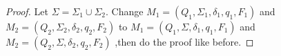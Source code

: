 \documentclass[12pt]{article}
\newenvironment{problem}[2][Problem]{\begin{trivlist}
\item[\hskip \labelsep {\bfseries #1}\hskip \labelsep {\bfseries #2.}]}{\end{trivlist}}
\begin{document}
\begin{paragraph}
\newline
\end{paragraph}


\begin{problem}{7}
\end{problem}
\begin{proof}
	\par Let $\Sigma = \Sigma_1 \cup \Sigma_2$. Change $M_1 = (Q_1, \Sigma_1, \delta_1, q_1, F_1)$ and $M_2 = (Q_2, \Sigma_2, \delta_2, q_2, F_2)$ to $M_1 = (Q_1, \Sigma, \delta_1, q_1, F_1)$ and $M_2 = (Q_2, \Sigma, \delta_2, q_2, F_2)$ ,then do the proof like before.
\end{proof}
\end{document}
